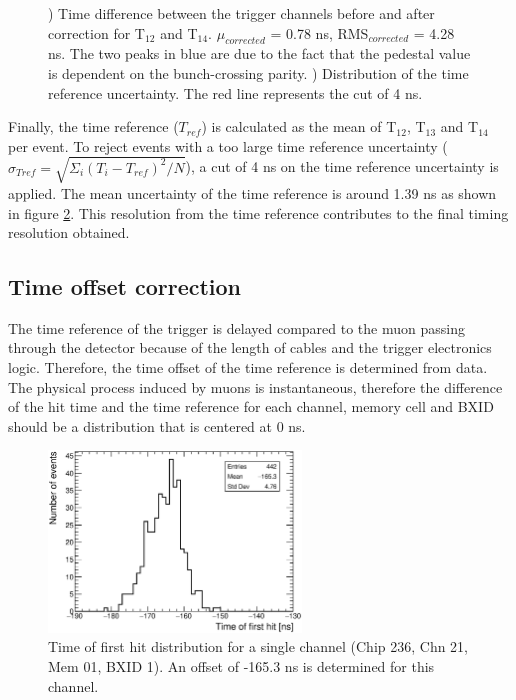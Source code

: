 \documentclass{JINST}
\begin{document}
\begin{figure}[htbp!]
\begin{subfigure}[t]{0.49\textwidth}
    \caption{} \label{fig:TRefErr}
  \end{subfigure}
  \caption{) Time difference between the trigger channels before and after correction for T$_{12}$ and T$_{14}$. $\mu_{corrected}$ = 0.78 ns, RMS$_{corrected}$ = 4.28 ns. The two peaks in blue are due to the fact that the pedestal value is dependent on the bunch-crossing parity. ) Distribution of the time reference uncertainty. The red line represents the cut of 4 ns.}
\end{figure}

Finally, the time reference ($T_{ref}$) is calculated as the mean of T$_{12}$, T$_{13}$ and T$_{14}$ per event. To reject events with a too large time reference uncertainty ($\sigma_{T{ref}} = \sqrt{\Sigma_i (T_{i} - T_{ref})^{2}/N}$), a cut of 4 ns on the time reference uncertainty is applied. The mean uncertainty of the time reference is around 1.39 ns as shown in figure \ref{fig:TRefErr}. This resolution from the time reference contributes to the final timing resolution obtained.

\subsection{Time offset correction}
\label{sec:TimeOffset}

The time reference of the trigger is delayed compared to the muon passing through the detector because of the length of cables and the trigger electronics logic. Therefore, the time offset of the time reference is determined from data. The physical process induced by muons is instantaneous, therefore the difference of the hit time and the time reference for each channel, memory cell and BXID should be a distribution that is centered at 0 ns.

\begin{figure}[htbp!]
  \centering
  \includegraphics[width=0.6\textwidth]{fig/Timing_Chip236_Chn21_Mem01_BXID1_withOffset.eps}
  \caption{Time of first hit distribution for a single channel (Chip 236, Chn 21, Mem 01, BXID 1). An offset of -165.3 ns is determined for this channel.}\label{fig:TimeChnwithOffset}
\end{figure}
\end{document}
